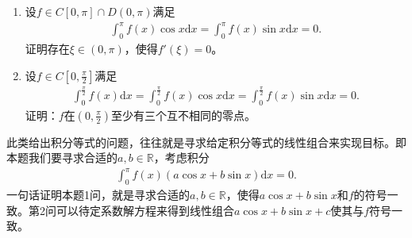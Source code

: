 \documentclass[../../main.tex]{subfiles}%
\begin{document}
\begin{example}
\begin{enumerate}
\item 设$f\in C[0,\pi]\cap D(0,\pi)$满足
\begin{align*}
\int_0^\pi f(x)\cos x\mathrm{d}x = \int_0^\pi f(x)\sin x\mathrm{d}x = 0.
\end{align*}
证明存在$\xi\in(0,\pi)$，使得$f'(\xi)=0$。

\item 设$f\in C[0,\frac{\pi}{2}]$满足
\begin{align}\label{example0.12-11.64}
\int_0^{\frac{\pi}{2}} f(x)\mathrm{d}x = \int_0^{\frac{\pi}{2}} f(x)\cos x\mathrm{d}x = \int_0^{\frac{\pi}{2}} f(x)\sin x\mathrm{d}x = 0.
\end{align}
证明：$f$在$(0,\frac{\pi}{2})$至少有三个互不相同的零点。
\end{enumerate}
\end{example}
\begin{note}
此类给出积分等式的问题，往往就是寻求给定积分等式的线性组合来实现目标。即本题我们要寻求合适的$a,b\in\mathbb{R}$，考虑积分
\begin{align*}
\int_0^\pi f(x)(a\cos x + b\sin x)\mathrm{d}x = 0.
\end{align*}
一句话证明本题1问，就是寻求合适的$a,b\in\mathbb{R}$，使得$a\cos x + b\sin x$和$f$的符号一致。第2问可以待定系数解方程来得到线性组合$a\cos x+b\sin x+c$使其与$f$符号一致。
\end{note}
\end{document}

